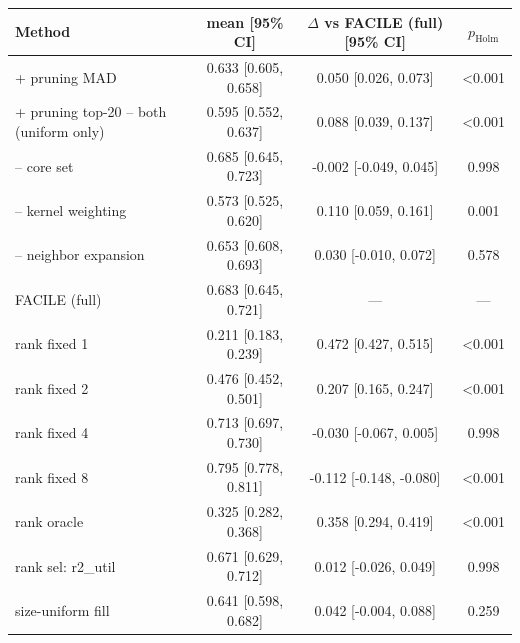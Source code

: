 \begin{tabular}{lccc}
\toprule
Method & mean [95\% CI] & $\Delta$ vs FACILE (full) [95\% CI] & $p_{\mathrm{Holm}}$ \\
\midrule
+ pruning MAD & 0.633 [0.605, 0.658] & 0.050 [0.026, 0.073] & <0.001 \\
+ pruning top-20%
-- both (uniform only) & 0.595 [0.552, 0.637] & 0.088 [0.039, 0.137] & <0.001 \\
-- core set & 0.685 [0.645, 0.723] & -0.002 [-0.049, 0.045] & 0.998 \\
-- kernel weighting & 0.573 [0.525, 0.620] & 0.110 [0.059, 0.161] & 0.001 \\
-- neighbor expansion & 0.653 [0.608, 0.693] & 0.030 [-0.010, 0.072] & 0.578 \\
FACILE (full) & 0.683 [0.645, 0.721] & --- & --- \\
rank fixed 1 & 0.211 [0.183, 0.239] & 0.472 [0.427, 0.515] & <0.001 \\
rank fixed 2 & 0.476 [0.452, 0.501] & 0.207 [0.165, 0.247] & <0.001 \\
rank fixed 4 & 0.713 [0.697, 0.730] & -0.030 [-0.067, 0.005] & 0.998 \\
rank fixed 8 & 0.795 [0.778, 0.811] & -0.112 [-0.148, -0.080] & <0.001 \\
rank oracle & 0.325 [0.282, 0.368] & 0.358 [0.294, 0.419] & <0.001 \\
rank sel: r2_util & 0.671 [0.629, 0.712] & 0.012 [-0.026, 0.049] & 0.998 \\
size-uniform fill & 0.641 [0.598, 0.682] & 0.042 [-0.004, 0.088] & 0.259 \\
\bottomrule
\end{tabular}

